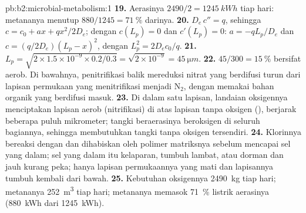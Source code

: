 \begin{solution}{pb:b2:microbial-metabolism:1}
\textbf{19.} Aerasinya $2490/2 = \qty{1245}{kWh}$ tiap hari: metananya
menutup $880/1245 = \qty{71}{\%}$ darinya.
\textbf{20.} $D_e\,c'' = q$, sehingga $c = c_0 + ax + qx^2/2D_e$;
dengan $c(L_p) = 0$ dan $c'(L_p) = 0$: $a = -qL_p/D_e$ dan $c =
(q/2D_e)(L_p - x)^2$, dengan $L_p^2 = 2D_ec_0/q$.
\textbf{21.} $L_p = \sqrt{2\times 1.5\times 10^{-9}\times 0.2/0.3} =
\sqrt{2\times 10^{-9}} = \qty{45}{\micro m}$.
\textbf{22.} $45/300 = \qty{15}{\%}$ bersifat aerob. Di bawahnya,
penitrifikasi balik mereduksi nitrat yang berdifusi turun dari lapisan
permukaan yang menitrifikasi menjadi $\mathrm{N_2}$, dengan memakai
bahan organik yang berdifusi masuk.
\textbf{23.} Di dalam satu lapisan, landaian oksigennya menciptakan
lapisan aerob (nitrifikasi) di atas lapisan tanpa oksigen
(), berjarak beberapa puluh mikrometer; tangki
beraerasinya beroksigen di seluruh bagiannya, sehingga
 membutuhkan tangki tanpa oksigen tersendiri.
\textbf{24.} Klorinnya bereaksi dengan dan dihabiskan oleh polimer
matriksnya sebelum mencapai sel yang dalam; sel yang dalam itu
kelaparan, tumbuh lambat, atau dorman dan jauh kurang peka; hanya
lapisan permukaannya yang mati dan lapisannya tumbuh kembali dari bawah.
\textbf{25.} Kebutuhan oksigennya \qty{2490}{kg} tiap hari; metananya
\qty{252}{m^3} tiap hari; metananya memasok \qty{71}{\%} listrik
aerasinya (\qty{880}{kWh} dari \qty{1245}{kWh}).
\end{solution}
